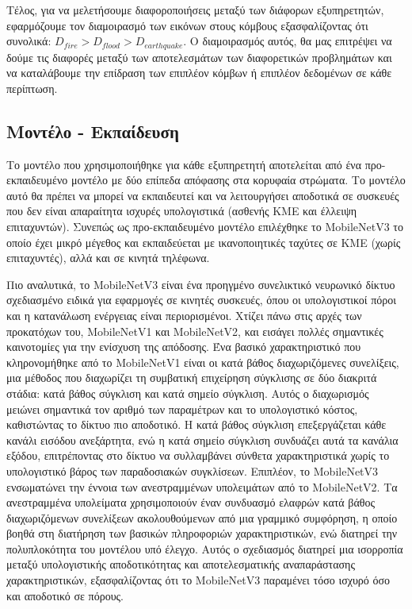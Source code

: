Τέλος, για να μελετήσουμε διαφοροποιήσεις μεταξύ των διάφορων εξυπηρετητών, εφαρμόζουμε τον διαμοιρασμό των εικόνων στους κόμβους εξασφαλίζοντας ότι συνολικά: $D_{fire} > D_{flood} > D_{earthquake}$. Ο διαμοιρασμός αυτός, θα μας επιτρέψει να δούμε τις διαφορές μεταξύ των αποτελεσμάτων των διαφορετικών προβλημάτων και να καταλάβουμε την επίδραση των επιπλέον κόμβων ή επιπλέον δεδομένων σε κάθε περίπτωση.

\subsection{Μοντέλο - Εκπαίδευση}

Το μοντέλο που χρησιμοποιήθηκε για κάθε εξυπηρετητή αποτελείται από ένα προ-εκπαιδευμένο μοντέλο με δύο επίπεδα απόφασης στα κορυφαία στρώματα. Το μοντέλο αυτό θα πρέπει να μπορεί να εκπαιδευτεί και να λειτουργήσει αποδοτικά σε συσκευές που δεν είναι απαραίτητα ισχυρές υπολογιστικά (ασθενής ΚΜΕ και έλλειψη επιταχυντών). Συνεπώς ως προ-εκπαιδευμένο μοντέλο επιλέχθηκε το MobileNetV3 το οποίο έχει μικρό μέγεθος και εκπαιδεύεται με ικανοποιητικές ταχύτες σε ΚΜΕ (χωρίς επιταχυντές), αλλά και σε κινητά τηλέφωνα.

Πιο αναλυτικά, το MobileNetV3 είναι ένα προηγμένο συνελικτικό νευρωνικό δίκτυο σχεδιασμένο ειδικά για εφαρμογές σε κινητές συσκευές, όπου οι υπολογιστικοί πόροι και η κατανάλωση ενέργειας είναι περιορισμένοι. Χτίζει πάνω στις αρχές των προκατόχων του, MobileNetV1 και MobileNetV2, και εισάγει πολλές σημαντικές καινοτομίες για την ενίσχυση της απόδοσης. Ένα βασικό χαρακτηριστικό που κληρονομήθηκε από το MobileNetV1 είναι οι κατά βάθος διαχωριζόμενες συνελίξεις, μια μέθοδος που διαχωρίζει τη συμβατική επιχείρηση σύγκλισης σε δύο διακριτά στάδια: κατά βάθος σύγκλιση και κατά σημείο σύγκλιση. Αυτός ο διαχωρισμός μειώνει σημαντικά τον αριθμό των παραμέτρων και το υπολογιστικό κόστος, καθιστώντας το δίκτυο πιο αποδοτικό. Η κατά βάθος σύγκλιση επεξεργάζεται κάθε κανάλι εισόδου ανεξάρτητα, ενώ η κατά σημείο σύγκλιση συνδυάζει αυτά τα κανάλια εξόδου, επιτρέποντας στο δίκτυο να συλλαμβάνει σύνθετα χαρακτηριστικά χωρίς το υπολογιστικό βάρος των παραδοσιακών συγκλίσεων. Επιπλέον, το MobileNetV3 ενσωματώνει την έννοια των ανεστραμμένων υπολειμάτων από το MobileNetV2. Τα ανεστραμμένα υπολείματα χρησιμοποιούν έναν συνδυασμό ελαφρών κατά βάθος διαχωριζόμενων συνελίξεων ακολουθούμενων από μια γραμμικό συμφόρηση, η οποίο βοηθά στη διατήρηση των βασικών πληροφοριών χαρακτηριστικών, ενώ διατηρεί την πολυπλοκότητα του μοντέλου υπό έλεγχο. Αυτός ο σχεδιασμός διατηρεί μια ισορροπία μεταξύ υπολογιστικής αποδοτικότητας και αποτελεσματικής αναπαράστασης χαρακτηριστικών, εξασφαλίζοντας ότι το MobileNetV3 παραμένει τόσο ισχυρό όσο και αποδοτικό σε πόρους.

